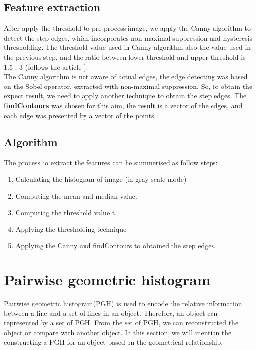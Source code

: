 \subsection{Feature extraction}
After apply the threshold to pre-process image, we apply the Canny algorithm to detect the step edges, which incorporates non-maximal suppression and hysteresis thresholding. The threshold value used in Canny algorithm also the value used in the previous step, and the ratio between lower threshold and upper threshold is 1.5 : 3 (follows the article \cite{palaniswamy2010automatic}).\\
The Canny algorithm is not aware of actual edges, the edge detecting was based on the Sobel operator, extracted with non-maximal suppression. So, to obtain the expect result, we  need to apply another technique to obtain the step edges. The \textbf{findContours} was chosen for this aim, the result is a vector of the edges, and each edge was presented by a vector of the points.

\subsection{Algorithm}
The process to extract the features can be summerised as follow steps:
\begin{enumerate}
\item Calculating the histogram of image (in gray-scale mode)
\item Computing the mean and median value.
\item Computing the threshold value t.
\item Applying the thresholding technique
\item Applying the Canny and findContours to obtained the step edges.
\end{enumerate}
\section{Pairwise geometric histogram}
Pairwise geometric histogram(PGH) is used to encode the relative information between a line and a set of lines in an object. Therefore, an object can represented by a set of PGH. From the set of PGH, we can reconstructed the object or compare with another object. In this section, we will mention the constructing a PGH for an object based on the geometrical relationship.
